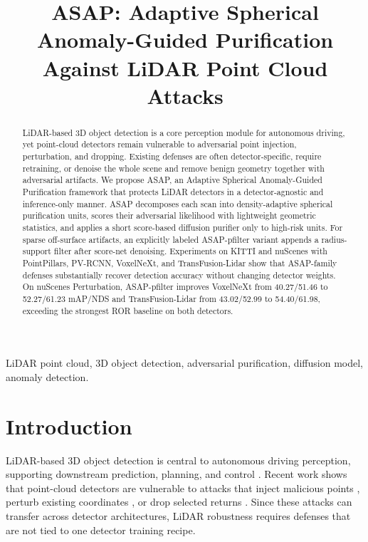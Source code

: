 \documentclass[conference]{IEEEtran}
\title{ASAP: Adaptive Spherical Anomaly-Guided Purification Against LiDAR Point Cloud Attacks}
\author{
\IEEEauthorblockN{Anonymous Authors}
\IEEEauthorblockA{Paper under double-blind review}
}
\begin{document}
\maketitle

\begin{abstract}
LiDAR-based 3D object detection is a core perception module for autonomous driving, yet point-cloud detectors remain vulnerable to adversarial point injection, perturbation, and dropping. Existing defenses are often detector-specific, require retraining, or denoise the whole scene and remove benign geometry together with adversarial artifacts. We propose ASAP, an Adaptive Spherical Anomaly-Guided Purification framework that protects LiDAR detectors in a detector-agnostic and inference-only manner. ASAP decomposes each scan into density-adaptive spherical purification units, scores their adversarial likelihood with lightweight geometric statistics, and applies a short score-based diffusion purifier only to high-risk units. For sparse off-surface artifacts, an explicitly labeled ASAP-pfilter variant appends a radius-support filter after score-net denoising. Experiments on KITTI and nuScenes with PointPillars, PV-RCNN, VoxelNeXt, and TransFusion-Lidar show that ASAP-family defenses substantially recover detection accuracy without changing detector weights. On nuScenes Perturbation, ASAP-pfilter improves VoxelNeXt from 40.27/51.46 to 52.27/61.23 mAP/NDS and TransFusion-Lidar from 43.02/52.99 to 54.40/61.98, exceeding the strongest ROR baseline on both detectors.
\end{abstract}

\begin{IEEEkeywords}
LiDAR point cloud, 3D object detection, adversarial purification, diffusion model, anomaly detection.
\end{IEEEkeywords}

\section{Introduction}

LiDAR-based 3D object detection is central to autonomous driving perception, supporting downstream prediction, planning, and control \cite{geiger2012kitti,sun2020waymo,caesar2020nuscenes}. Recent work shows that point-cloud detectors are vulnerable to attacks that inject malicious points \cite{cao2019adversarial,tu2020physically}, perturb existing coordinates \cite{xiang2019pointcloud}, or drop selected returns \cite{zheng2019pointcloud}. Since these attacks can transfer across detector architectures, LiDAR robustness requires defenses that are not tied to one detector training recipe.
\end{document}
